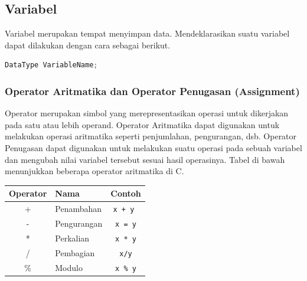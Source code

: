 \subsection{Variabel}
Variabel merupakan tempat menyimpan data. Mendeklarasikan suatu variabel dapat dilakukan dengan cara sebagai berikut.
\begin{lstlisting}[language=c,caption=Deklarasi Variabel C,label=lst:deklarasivariabel,captionpos=t]
DataType VariableName;
\end{lstlisting}
\subsubsection{Operator Aritmatika dan Operator Penugasan (Assignment)}
Operator merupakan simbol yang merepresentasikan operasi untuk dikerjakan pada satu atau lebih operand.
Operator Aritmatika dapat digunakan untuk melakukan operasi aritmatika seperti penjumlahan, pengurangan, dsb.
Operator Penugasan dapat digunakan untuk melakukan suatu operasi pada sebuah variabel dan mengubah nilai variabel tersebut sesuai hasil operasinya.
Tabel di bawah menunjukkan beberapa operator aritmatika di C.
\begin{center}
	\begin{tabular}{|c|l|c|}
		\hline
		\multicolumn{1}{|l|}{\textbf{Operator}} & \textbf{Nama} & \multicolumn{1}{l|}{\textbf{Contoh}} \\ \hline
		+                                       & Penambahan    & \verb|x + y |                        \\ \hline
		-                                       & Pengurangan   & \verb|x = y|                         \\ \hline
		*                                       & Perkalian     & \verb|x * y|                         \\ \hline
		/                                       & Pembagian     & \verb|x/y|                           \\ \hline
		\%                                      & Modulo        & \verb|x % y|                         \\ \hline
	\end{tabular}
\end{center}

